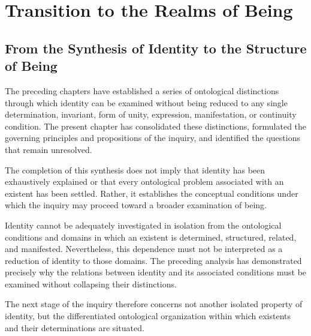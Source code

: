 
\section{Transition to the Realms of Being}
\label{sec:transition-to-the-realms-of-being}


\subsection{From the Synthesis of Identity to the Structure of Being}

The preceding chapters have established a series of
ontological distinctions through which identity can be
examined without being reduced to any single determination,
invariant, form of unity, expression, manifestation, or
continuity condition. The present chapter has consolidated
these distinctions, formulated the governing principles
and propositions of the inquiry, and identified the
questions that remain unresolved.

The completion of this synthesis does not imply that
identity has been exhaustively explained or that every
ontological problem associated with an existent has been
settled. Rather, it establishes the conceptual conditions
under which the inquiry may proceed toward a broader
examination of being.

Identity cannot be adequately investigated in isolation
from the ontological conditions and domains in which an
existent is determined, structured, related, and manifested.
Nevertheless, this dependence must not be interpreted as
a reduction of identity to those domains. The preceding
analysis has demonstrated precisely why the relations
between identity and its associated conditions must be
examined without collapsing their distinctions.

The next stage of the inquiry therefore concerns not
another isolated property of identity, but the differentiated
ontological organization within which existents and their
determinations are situated.

